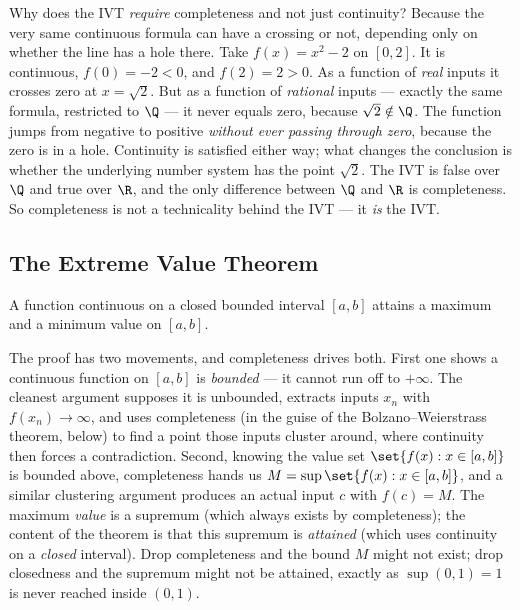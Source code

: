 \begin{whybox}
Why does the IVT \emph{require} completeness and not just continuity? Because the very same
continuous formula can have a crossing or not, depending only on whether the line has a
hole there. Take $f(x)=x^2-2$ on $[0,2]$. It is continuous, $f(0)=-2<0$, and $f(2)=2>0$. As
a function of \emph{real} inputs it crosses zero at $x=\sqrt2$. But as a function of
\emph{rational} inputs --- exactly the same formula, restricted to $\Q$ --- it never equals
zero, because $\sqrt2\notin\Q$. The function jumps from negative to positive
\emph{without ever passing through zero}, because the zero is in a hole. Continuity is
satisfied either way; what changes the conclusion is whether the underlying number system
has the point $\sqrt2$. The IVT is false over $\Q$ and true over $\R$, and the only
difference between $\Q$ and $\R$ is completeness. So completeness is not a technicality
behind the IVT --- it \emph{is} the IVT.
\end{whybox}

\subsection*{The Extreme Value Theorem}

\begin{theorem}
\label{ch41:evt}
A function continuous on a closed bounded interval $[a,b]$ attains a maximum and a minimum
value on $[a,b]$.
\end{theorem}

The proof has two movements, and completeness drives both. First one shows a continuous
function on $[a,b]$ is \emph{bounded} --- it cannot run off to $+\infty$. The cleanest
argument supposes it is unbounded, extracts inputs $x_n$ with $f(x_n)\to\infty$, and uses
completeness (in the guise of the Bolzano--Weierstrass theorem, below) to find a point
those inputs cluster around, where continuity then forces a contradiction. Second, knowing
the value set $\set{f(x):x\in[a,b]}$ is bounded above, completeness hands us
$M=\sup\set{f(x):x\in[a,b]}$, and a similar clustering argument produces an actual input
$c$ with $f(c)=M$. The maximum \emph{value} is a supremum (which always exists by
completeness); the content of the theorem is that this supremum is \emph{attained} (which
uses continuity on a \emph{closed} interval). Drop completeness and the bound $M$ might not
exist; drop closedness and the supremum might not be attained, exactly as $\sup(0,1)=1$ is
never reached inside $(0,1)$.

